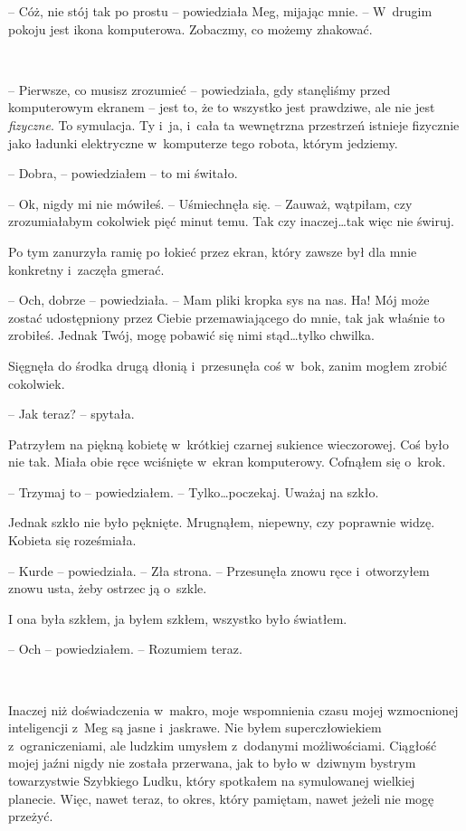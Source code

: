 \documentclass[oneside,polish,11pt,sfheadings]{mwbk}
\begin{document}
-- Cóż, nie stój tak po prostu -- powiedziała Meg, mijając mnie. -- W~drugim pokoju jest ikona komputerowa. Zobaczmy, co możemy zhakować.

~

-- Pierwsze, co musisz zrozumieć -- powiedziała, gdy stanęliśmy przed
komputerowym ekranem -- jest to, że to wszystko jest prawdziwe, ale nie
jest \emph{fizyczne}. To symulacja. Ty i~ja, i~cała ta wewnętrzna
przestrzeń istnieje fizycznie jako ładunki elektryczne w~komputerze tego
robota, którym jedziemy.

-- Dobra, -- powiedziałem -- to mi świtało.

-- Ok, nigdy mi nie mówiłeś. -- Uśmiechnęła się. -- Zauważ, wątpiłam, czy
zrozumiałabym cokolwiek pięć minut temu. Tak czy inaczej\ldots tak więc nie
świruj.

Po tym zanurzyła ramię po łokieć przez ekran, który zawsze był dla mnie
konkretny i~zaczęła gmerać. 

-- Och, dobrze -- powiedziała. -- Mam pliki
kropka sys na nas. Ha! Mój może zostać udostępniony przez Ciebie
przemawiającego do mnie, tak jak właśnie to zrobiłeś. Jednak Twój, mogę
pobawić się nimi stąd\ldots tylko chwilka.

Sięgnęła do środka drugą dłonią i~przesunęła coś w~bok, zanim mogłem
zrobić cokolwiek.

-- Jak teraz? -- spytała.

Patrzyłem na piękną kobietę w~krótkiej czarnej sukience wieczorowej. Coś
było nie tak. Miała obie ręce wciśnięte w~ekran komputerowy. Cofnąłem
się o~krok.

-- Trzymaj to -- powiedziałem. -- Tylko\ldots poczekaj. Uważaj na szkło.

Jednak szkło nie było pęknięte. Mrugnąłem, niepewny, czy poprawnie
widzę. Kobieta się roześmiała.

-- Kurde -- powiedziała. -- Zła strona. -- Przesunęła znowu ręce i~otworzyłem znowu usta, żeby ostrzec ją o~szkle.

I ona była szkłem, ja byłem szkłem, wszystko było światłem.

-- Och -- powiedziałem. -- Rozumiem teraz.

~

Inaczej niż doświadczenia w~makro, moje wspomnienia czasu mojej
wzmocnionej inteligencji z~Meg są jasne i~jaskrawe. Nie byłem
superczłowiekiem z~ograniczeniami, ale ludzkim umysłem z~dodanymi
możliwościami. Ciągłość mojej jaźni nigdy nie została przerwana, jak to
było w~dziwnym bystrym towarzystwie Szybkiego Ludku, który spotkałem na
symulowanej wielkiej planecie. Więc, nawet teraz, to okres, który
pamiętam, nawet jeżeli nie mogę przeżyć.
\end{document}
